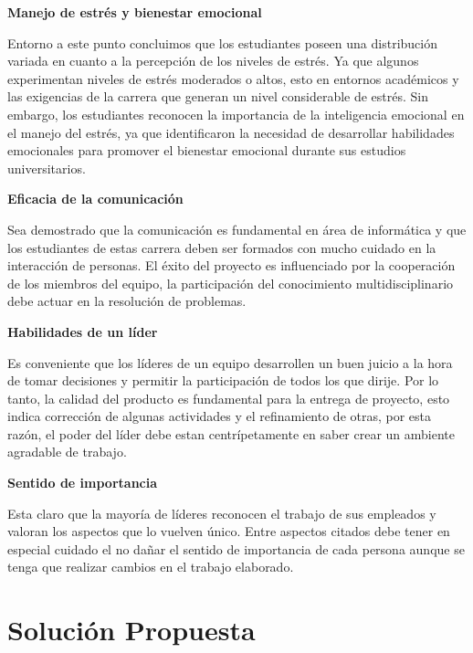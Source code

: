 \documentclass[journal]{IEEEtran}
\begin{document}
\begin{center}
	\textbf{Manejo de estrés y bienestar emocional}
\end{center}
Entorno a este punto concluimos que los estudiantes poseen una distribución variada en cuanto a la percepción de los niveles de estrés. Ya que algunos experimentan niveles de estrés moderados o altos, esto en entornos académicos y las exigencias de la carrera que generan un nivel considerable de estrés. Sin embargo, los estudiantes reconocen la importancia de la inteligencia emocional en el manejo del estrés, ya que identificaron la necesidad de desarrollar habilidades emocionales para promover el bienestar emocional durante sus estudios universitarios.

\begin{center}
	\textbf{Eficacia de la comunicación}
\end{center}
Sea demostrado que la comunicación es fundamental en área de informática y que los estudiantes de estas carrera deben ser formados con mucho cuidado en la interacción de personas. El éxito del proyecto es influenciado por la cooperación de los miembros del equipo, la participación del conocimiento multidisciplinario debe actuar en la resolución de problemas.


\begin{center}
	\textbf{Habilidades de un líder}
\end{center}
Es conveniente que los líderes de un equipo desarrollen un buen juicio a la hora de tomar decisiones y permitir la participación de todos los que dirije. Por lo tanto, la calidad del producto es fundamental para la entrega de proyecto, esto indica corrección de algunas actividades y el refinamiento de otras, por esta razón, el poder del líder debe estan centrípetamente en saber crear un ambiente agradable de trabajo.

\begin{center}
	\textbf{Sentido de importancia}
\end{center}
Esta claro que la mayoría de líderes reconocen el trabajo de sus empleados y valoran los aspectos que lo vuelven único. Entre aspectos citados debe tener en especial cuidado el no dañar el sentido de importancia de cada persona aunque se tenga que realizar cambios en el trabajo elaborado.

\newpage

\section{Solución Propuesta}
\end{document}
